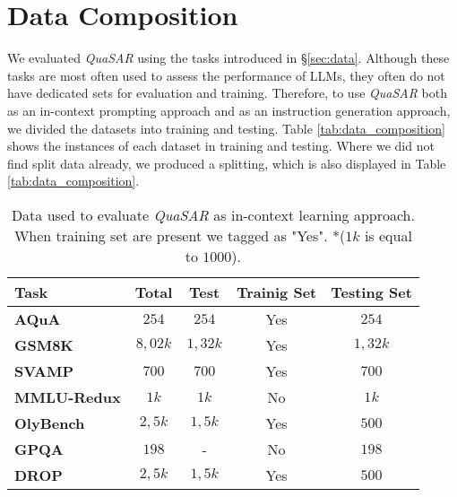 \documentclass[11pt]{article}
\newcommand{\QuaSAR}{\emph{QuaSAR}\xspace}
\begin{document}
\begin{table}[h]
\section{Data Composition}
\label{app:data_composition}

We evaluated \QuaSAR using the tasks introduced in \S \ref{sec:data}. Although these tasks are most often used to assess the performance of LLMs, they often do not have dedicated sets for evaluation and training. Therefore, to use \QuaSAR both as an in-context prompting approach and as an instruction generation approach, we divided the datasets into training and testing. Table \ref{tab:data_composition} shows the instances of each dataset in training and testing. Where we did not find split data already, we produced a splitting, which is also displayed in Table \ref{tab:data_composition}.

\vspace{0.5cm}


\small
\centering
\setlength{\tabcolsep}{3.5pt}
\begin{tabularx}{0.46\textwidth}{lcccc}
    \toprule
    \textbf{Task} & \textbf{Total} & \textbf{Test} & \textbf{Trainig Set} & \textbf{Testing Set} \\
    \midrule
    \textbf{AQuA}        & $254$ & $254$ & Yes & $254$ \\
    \textbf{GSM8K}     & $8,02k$ & $1,32k$ & Yes  & $1,32k$ \\
    \textbf{SVAMP}      & $700$ & $700$ & Yes   & $700$ \\
    \textbf{MMLU-Redux}      & $1k$ & $1k$ & No & $1k$ \\
    \textbf{OlyBench}      & $2,5k$ & $1,5k$ & Yes   & $500$ \\
    \textbf{GPQA}      & $198$ & - & No  & $198$ \\
    \textbf{DROP}      & $2,5k$ & $1,5k$ & Yes & $500$ \\
    \bottomrule
\end{tabularx}
\caption{Data used to evaluate \QuaSAR as in-context learning approach. When training set are present we tagged as "Yes". *($1k$ is equal to $1000$).}
\label{tab:data_composition_test_data}


\vspace{0.5cm}


\end{table}
\end{document}
